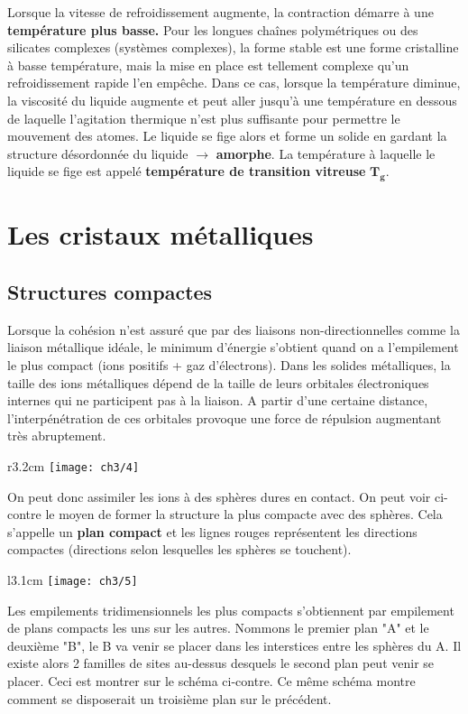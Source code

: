 	Lorsque la vitesse de refroidissement augmente, la contraction démarre à une \textbf{température plus basse.} Pour les longues chaînes polymétriques ou des silicates complexes (systèmes complexes), la forme stable est une forme cristalline à basse température, mais la mise en place est tellement complexe qu'un refroidissement rapide l'en empêche. Dans ce cas, lorsque la température diminue, la viscosité du liquide augmente et peut aller jusqu'à une température en dessous de laquelle l'agitation thermique n'est plus suffisante pour permettre le mouvement des atomes. Le liquide se fige alors et forme un solide en gardant la structure désordonnée du liquide $\rightarrow$ \textbf{amorphe}. La température à laquelle le liquide se fige est appelé \textbf{température de transition vitreuse} $\mathbf{T_g}$.
	
\section{Les cristaux métalliques}
		\subsection{Structures compactes}
			Lorsque la cohésion n'est assuré que par des liaisons non-directionnelles comme la liaison métallique idéale, le minimum d'énergie s'obtient quand on a l'empilement le plus compact (ions positifs + gaz d'électrons). Dans les solides métalliques, la taille des ions métalliques dépend de la taille de leurs orbitales électroniques internes qui ne participent pas à la liaison. A partir d'une certaine distance, l'interpénétration de ces orbitales provoque une force de répulsion augmentant très abruptement. \\
			
			\begin{wrapfigure}[5]{r}{3.2cm}
			\vspace{-5mm}
			\texttt{[image: ch3/4]}
			\end{wrapfigure}
			On peut donc assimiler les ions à des sphères dures en contact. On peut voir ci-contre le moyen de former la structure la plus compacte avec des sphères. Cela s'appelle un \textbf{plan compact} et les lignes rouges représentent les directions compactes (directions selon lesquelles les sphères se touchent).\\
			
			\begin{wrapfigure}[4]{l}{3.1cm}
			\vspace{-7mm}
			\texttt{[image: ch3/5]}
			\end{wrapfigure}
			Les empilements tridimensionnels les plus compacts s'obtiennent par empilement de plans compacts les uns sur les autres. Nommons le premier plan "A" et le deuxième "B", le B va venir se placer dans les interstices entre les sphères du A. Il existe alors 2 familles de sites au-dessus desquels le second plan peut venir se placer. Ceci est montrer sur le schéma ci-contre. Ce même schéma montre comment se disposerait un troisième plan sur le précédent. 
			
